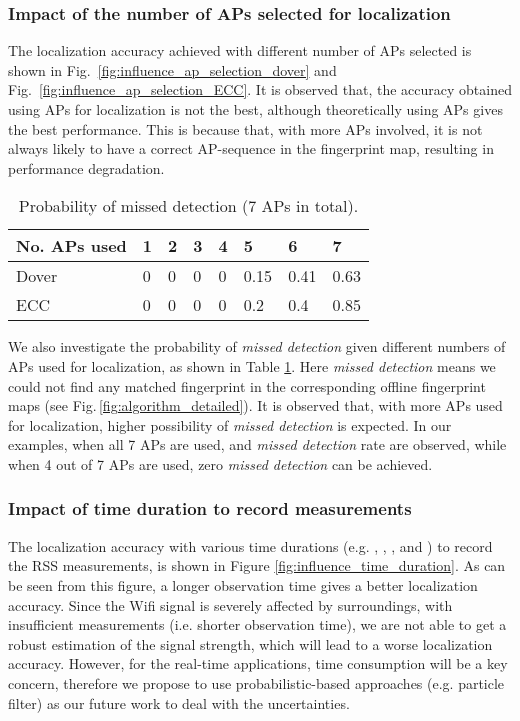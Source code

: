 \documentclass[10pt, conference, letterpaper]{IEEEtran}
\begin{document}
\subsubsection{Impact of the number of APs selected for localization}
The localization accuracy achieved with different number of APs selected is shown in Fig.~\ref{fig:influence_ap_selection_dover} and Fig.~\ref{fig:influence_ap_selection_ECC}. 
It is observed that, the accuracy obtained using  APs for localization is not the best, 
although theoretically using  APs gives the best performance. 
This is because that, with more APs involved, it is not always likely to have a correct AP-sequence in the fingerprint map, resulting in performance degradation.

\begin{table}
 \centering
 \caption[Successful rate]
 {Probability of missed detection (7 APs in total).}
 \centering
 \begin{tabular}{|p{2.5cm}<{\centering}|p{0.3cm}<{\centering}|p{0.3cm}<{\centering}|p{0.3cm}<{\centering}|p{0.45cm}<{\centering}|p{0.45cm}<{\centering}|p{0.45cm}<{\centering}|p{0.45cm}<{\centering}|}
 \hline
 No. APs used &1&2&3&4&5&6&7
 \\\hline
 Dover& 0&0&0&0&0.15&0.41&0.63\\
 \hline
 ECC& 0&0&0&0&0.2&0.4&0.85\\
 \hline
 \end{tabular}
 \label{table:successful_rate_ap_selection}
 \vspace{-0.2in}
 \end{table}

We also investigate the probability of \emph{missed detection} given different numbers of APs used for localization, 
as shown in Table \ref{table:successful_rate_ap_selection}. 
Here \emph{missed detection} means we could not find any matched fingerprint in the corresponding offline fingerprint maps (see Fig.\,\ref{fig:algorithm_detailed}).
It is observed that, with more APs used for localization, higher possibility of \emph{missed detection} is expected. 
In our examples, when all 7 APs are used,  and  \emph{missed detection} rate are observed, while when 4 out of 7 APs are used, zero \emph{missed detection} can be achieved.

\subsubsection{Impact of time duration to record measurements}
The localization accuracy with various time durations (e.g. , , , and ) to record the RSS measurements, is shown in Figure \ref{fig:influence_time_duration}. 
As can be seen from this figure, a longer observation time gives a better localization accuracy. 
Since the Wifi signal is severely affected by surroundings, with insufficient measurements (i.e. shorter observation time), 
we are not able to get a robust estimation of the signal strength, which will lead to a worse localization accuracy. 
However, for the real-time applications, time consumption will be a key concern, 
therefore we propose to use probabilistic-based approaches (e.g. particle filter) as our future work to deal with the uncertainties.
\end{document}
